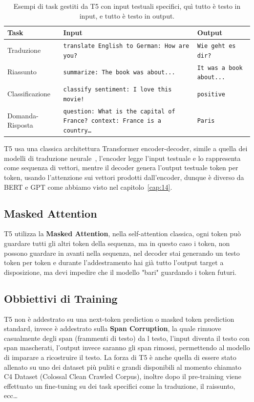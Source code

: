 \begin{table}[htbp]
\centering
\begin{adjustbox}{width=\textwidth}
\begin{tabular}{|l|p{7cm}|l|}
\hline
\textbf{Task} & \textbf{Input} & \textbf{Output} \\
\hline
Traduzione & \texttt{translate English to German: How are you?} & \texttt{Wie geht es dir?} \\
\hline
Riassunto & \texttt{summarize: The book was about...} & \texttt{It was a book about...} \\
\hline
Classificazione & \texttt{classify sentiment: I love this movie!} & \texttt{positive} \\
\hline
Domanda-Risposta & \texttt{question: What is the capital of France? context: France is a country\dots} & \texttt{Paris} \\
\hline
\end{tabular}
\end{adjustbox}
\caption{Esempi di task gestiti da T5 con input testuali specifici, quì tutto è testo in input, e tutto è testo in output.}
\end{table}
T5 usa una classica architettura Transformer encoder-decoder, simile a quella dei modelli di traduzione neurale~\cite{vaswani2017attention}, l'encoder legge l'input testuale e lo rappresenta come sequenza di vettori, mentre il decoder genera l'output testuale token per token, usando l'attenzione sui vettori prodotti dall'encoder, dunque è diverso da BERT e GPT come abbiamo visto nel capitolo~\ref{cap:14}.

\subsection{Masked Attention}
T5 utilizza la \textbf{Masked Attention}, nella self-attention classica, ogni token può guardare tutti gli altri token della sequenza, ma in questo caso i token, non possono guardare in avanti nella sequenza, nel decoder stai generando un testo token per token e durante l'addestramento hai già tutto l'output target a disposizione, ma devi impedire che il modello "bari" guardando i token futuri.

\subsection{Obbiettivi di Training}

T5 non è addestrato su una next-token prediction o masked token prediction standard, invece è addestrato sulla \textbf{Span Corruption}, la quale rimuove casualmente degli span (frammenti di testo) da l testo, l'input diventa il testo con span mascherati, l'output invece saranno gli span rimossi, permettendo al modello di imparare a ricostruire il testo. La forza di T5 è anche quella di essere stato allenato su uno dei dataset più puliti e grandi disponibili al momento chiamato C4 Dataset (Colossal Clean Crawled Corpus), inoltre dopo il pre-training viene effettuato un fine-tuning su dei task specifici come la traduzione, il raissunto, ecc\dots

